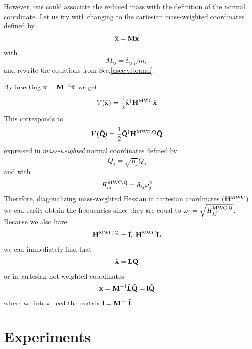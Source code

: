 \documentclass[a4paper,titlepage,twoside,fleqn,12pt]{book}
\begin{document}
\begin{appendices}
However, one could 
associate the reduced mass with the definition of the normal coordinate.
Let us try with changing to the cartesian mass\hyp{}weighted coordinates defined by
\begin{equation}
\tilde{\bf x} = {\bf M}{\bf x} 
\end{equation}
with
\begin{equation}
M_{ij} = \delta_{ij} \sqrt{m_i}
\end{equation}
and rewrite the equations from Sec.\ref{asec:vibranal}.

By inserting ${\bf x}={\bf M}^{-1}\tilde{\bf x}$ we get
\begin{equation}
V(\tilde{\bf x}) = \frac{1}{2} \tilde{\bf x}^{\dagger} {\bf H}^{\rm MWC}  \tilde{\bf x}
\end{equation}
This corresponds to 
\begin{equation}
V(\tilde{\bf Q}) = \frac{1}{2} \tilde{\bf Q}^{\dagger} {\bf H}^{\rm MWC,Q}  \tilde{\bf Q}
\end{equation}
expressed in \emph{mass-weighted} normal coordinates defined by
\begin{equation}
\tilde{Q}_j = \sqrt{\mu_j} Q_j
\end{equation}
and with 
\begin{equation}
H_{ij}^{\rm MWC,Q} = \delta_{ij} \omega_j^2
\end{equation}
Therefore, diagonalizing mass-weighted Hessian in cartesian coordinates (${\bf H}^{\rm MWC}$)
we can easily obtain the frequencies since they are equal to $\omega_j=\sqrt{H_{jj}^{\rm MWC,Q}}$.
Because we also have
\begin{equation}
{\bf H}^{\rm MWC,Q} = \tilde{\bf L}^{\dagger} {\bf H}^{\rm MWC} \tilde{\bf L}
\end{equation}
we can immediately find that
\begin{equation}
\tilde{\bf x} = \tilde{\bf L} \tilde{\bf Q}
\end{equation}
or in cartesian not-weighted coordinates
\begin{equation}
{\bf x} = {\bf M}^{-1} \tilde{\bf L} \tilde{\bf Q} = {\bf l} \tilde{\bf Q}
\end{equation}
where we introduced the matrix ${\bf l}={\bf M}^{-1} \tilde{\bf L}$.


\chapter{Experiments\label{a:exp-ftir}}


\end{appendices}
\end{document}
